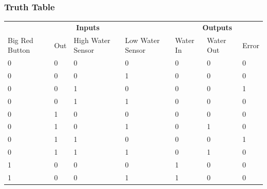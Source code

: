 \documentclass[11pt]{article}
\begin{document}
\subsubsection*{Truth Table}
\begin{table}[h!]
    \begin{tabular}{llll|lll}
        \multicolumn{4}{c|}{\textbf{Inputs}} & \multicolumn{3}{c}{\textbf{Outputs}}                                                                       \\
        Big Red Button                       & Out                                  & High Water Sensor & Low Water Sensor & Water In & Water Out & Error \\ \hline
        0                                    & 0                                    & 0                 & 0                & 0        & 0         & 0     \\
        0                                    & 0                                    & 0                 & 1                & 0        & 0         & 0     \\
        0                                    & 0                                    & 1                 & 0                & 0        & 0         & 1     \\
        0                                    & 0                                    & 1                 & 1                & 0        & 0         & 0     \\
        0                                    & 1                                    & 0                 & 0                & 0        & 0         & 0     \\
        0                                    & 1                                    & 0                 & 1                & 0        & 1         & 0     \\
        0                                    & 1                                    & 1                 & 0                & 0        & 0         & 1     \\
        0                                    & 1                                    & 1                 & 1                & 0        & 1         & 0     \\
        1                                    & 0                                    & 0                 & 0                & 1        & 0         & 0     \\
        1                                    & 0                                    & 0                 & 1                & 1        & 0         & 0     \\

\end{tabular}
\end{table}
\end{document}
